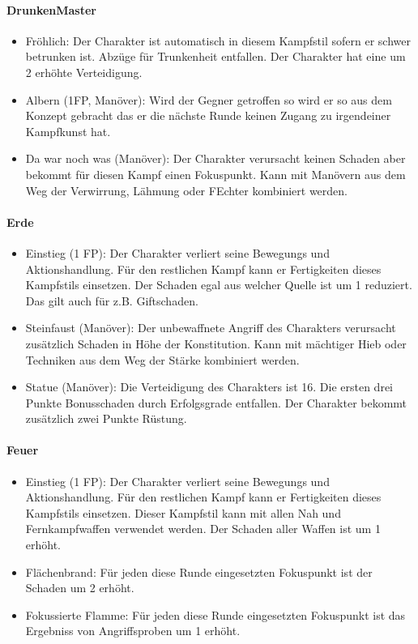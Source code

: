 \documentclass{article}
\begin{document}
\paragraph{DrunkenMaster}

\begin{itemize}
\item Fröhlich: Der Charakter ist automatisch in diesem Kampfstil sofern er schwer betrunken ist. Abzüge für Trunkenheit entfallen. Der Charakter hat eine um 2 erhöhte Verteidigung.
\item Albern (1FP, Manöver): Wird der Gegner getroffen so wird er so aus dem Konzept gebracht das er die nächste Runde keinen Zugang zu irgendeiner Kampfkunst hat.
\item Da war noch was (Manöver): Der Charakter verursacht keinen Schaden aber bekommt für diesen Kampf einen Fokuspunkt. Kann mit Manövern aus dem Weg der Verwirrung, Lähmung oder FEchter kombiniert werden.
\end{itemize}

\paragraph{Erde}

\begin{itemize}
\item Einstieg (1 FP): Der Charakter verliert seine Bewegungs und Aktionshandlung. Für den restlichen Kampf kann er Fertigkeiten dieses Kampfstils einsetzen. Der Schaden egal aus welcher Quelle ist um 1 reduziert. Das gilt auch für z.B. Giftschaden.
\item Steinfaust (Manöver): Der unbewaffnete Angriff des Charakters verursacht zusätzlich Schaden in Höhe der Konstitution. Kann mit mächtiger Hieb oder Techniken aus dem Weg der Stärke kombiniert werden.
\item Statue (Manöver): Die Verteidigung des Charakters ist 16. Die ersten drei Punkte Bonusschaden durch Erfolgsgrade entfallen. Der Charakter bekommt zusätzlich zwei Punkte Rüstung.
\end{itemize}

\paragraph{Feuer}

\begin{itemize}
\item Einstieg (1 FP): Der Charakter verliert seine Bewegungs und Aktionshandlung. Für den restlichen Kampf kann er Fertigkeiten dieses Kampfstils einsetzen. Dieser Kampfstil kann mit allen Nah und Fernkampfwaffen verwendet werden. Der Schaden aller Waffen ist um 1 erhöht.
\item Flächenbrand: Für jeden diese Runde eingesetzten Fokuspunkt ist der Schaden um 2 erhöht.
\item Fokussierte Flamme: Für jeden diese Runde eingesetzten Fokuspunkt ist das Ergebniss von Angriffsproben um 1 erhöht.
\end{itemize}
\end{document}
